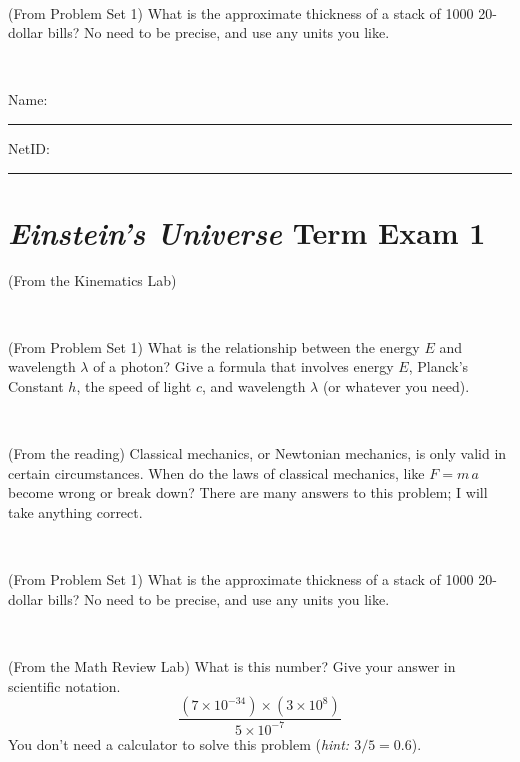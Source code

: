 \documentclass[12pt, letterpaper]{article}
\begin{document}
\vfill ~

\begin{problem} (From Problem Set 1)
What is the approximate thickness of a stack of 1000 20-dollar bills?
No need to be precise, and use any units you like.
\end{problem}


\vfill ~


\cleardoublepage



\noindent
Name: \rule[-1ex]{0.60\textwidth}{0.1pt}
NetID: \rule[-1ex]{0.20\textwidth}{0.1pt}

\section*{\textsl{Einstein's Universe} Term Exam 1}
\setcounter{problem}{1}


\begin{problem} (From the Kinematics Lab)

\end{problem}


\vfill ~

\begin{problem} (From Problem Set 1)
What is the relationship between the energy $E$ and wavelength
$\lambda$ of a photon? Give a formula that involves energy $E$,
Planck's Constant $h$, the speed of light $c$, and wavelength
$\lambda$ (or whatever you need).
\end{problem}

\vfill ~

\begin{problem} (From the reading)
Classical mechanics, or Newtonian mechanics, is only valid in certain
circumstances. When do the laws of classical mechanics, like $F =
m\,a$ become wrong or break down? There are many answers to this
problem; I will take anything correct.
\end{problem}


\vfill ~

\begin{problem} (From Problem Set 1)
What is the approximate thickness of a stack of 1000 20-dollar bills?
No need to be precise, and use any units you like.
\end{problem}


\vfill ~


\clearpage


\begin{problem} (From the Math Review Lab)
What is this number? Give your answer in scientific notation.
$$
\frac{(7\times10^{-34})\times(3\times10^8)}{5\times10^{-7}}
$$
You don't need a calculator to solve this problem (\textit{hint: $3/5=0.6$}).
\end{problem}
\end{document}
